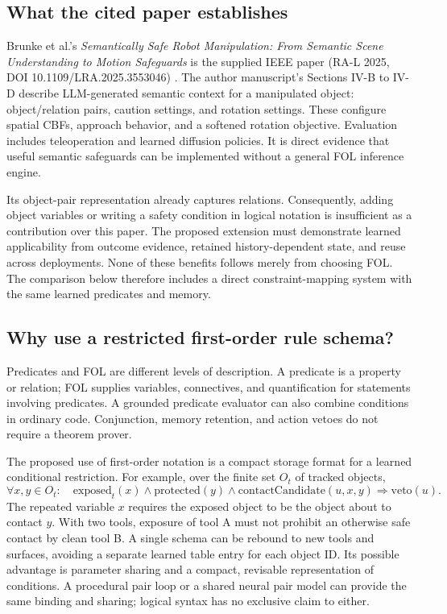 \documentclass[10pt]{article}
\begin{document}
\subsection{What the cited paper establishes}
Brunke et al.'s \emph{Semantically Safe Robot Manipulation: From Semantic Scene Understanding to Motion Safeguards} is the supplied IEEE paper (RA-L 2025, DOI 10.1109/LRA.2025.3553046) \cite{brunke}. The author manuscript's Sections IV-B to IV-D describe LLM-generated semantic context for a manipulated object: object/relation pairs, caution settings, and rotation settings. These configure spatial CBFs, approach behavior, and a softened rotation objective. Evaluation includes teleoperation and learned diffusion policies. It is direct evidence that useful semantic safeguards can be implemented without a general FOL inference engine.

Its object-pair representation already captures relations. Consequently, adding object variables or writing a safety condition in logical notation is insufficient as a contribution over this paper. The proposed extension must demonstrate learned applicability from outcome evidence, retained history-dependent state, and reuse across deployments. None of these benefits follows merely from choosing FOL. The comparison below therefore includes a direct constraint-mapping system with the same learned predicates and memory.

\subsection{Why use a restricted first-order rule schema?}
Predicates and FOL are different levels of description. A predicate is a property or relation; FOL supplies variables, connectives, and quantification for statements involving predicates. A grounded predicate evaluator can also combine conditions in ordinary code. Conjunction, memory retention, and action vetoes do not require a theorem prover.

The proposed use of first-order notation is a compact storage format for a learned conditional restriction. For example, over the finite set $O_t$ of tracked objects,
\[
\forall x,y\in O_t:\quad
\mathrm{exposed}_t(x)\land\mathrm{protected}(y)
\land\mathrm{contactCandidate}(u,x,y)
\Rightarrow\mathrm{veto}(u).
\]
The repeated variable $x$ requires the exposed object to be the object about to contact $y$. With two tools, exposure of tool A must not prohibit an otherwise safe contact by clean tool B. A single schema can be rebound to new tools and surfaces, avoiding a separate learned table entry for each object ID. Its possible advantage is parameter sharing and a compact, revisable representation of conditions. A procedural pair loop or a shared neural pair model can provide the same binding and sharing; logical syntax has no exclusive claim to either.
\end{document}
